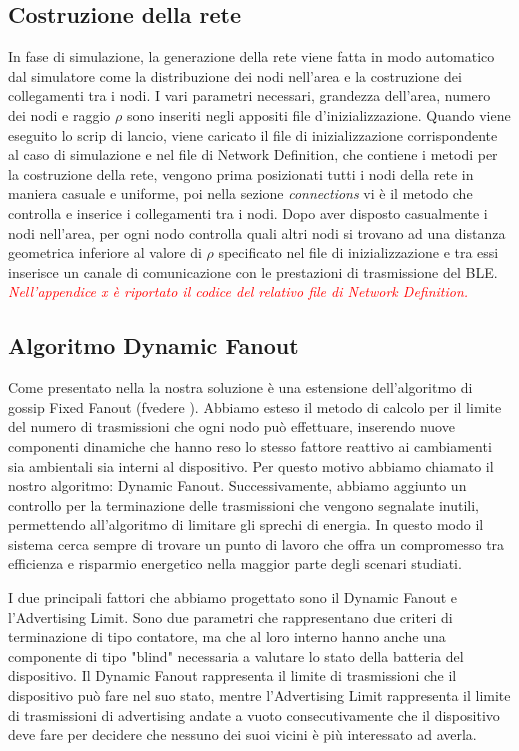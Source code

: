 \subsection{Costruzione della rete}
In fase di simulazione, la generazione della rete viene fatta in modo automatico dal simulatore come la distribuzione dei nodi nell'area e la costruzione dei collegamenti tra i nodi. I vari parametri necessari, grandezza dell'area, numero dei nodi e raggio $\rho$ sono inseriti negli appositi file d'inizializzazione. Quando viene eseguito lo scrip di lancio, viene caricato il file di inizializzazione corrispondente al caso di simulazione e nel file di Network Definition, che contiene i metodi per la costruzione della rete, vengono prima posizionati tutti i nodi della rete in maniera casuale e uniforme, poi nella sezione \textit{connections} vi è il metodo che controlla e inserice i collegamenti tra i nodi. Dopo aver disposto casualmente i nodi nell'area, per ogni nodo controlla quali altri nodi si trovano ad una distanza geometrica inferiore al valore di $\rho$ specificato nel file di inizializzazione e tra essi inserisce un canale di comunicazione con le prestazioni di trasmissione del BLE. \textit{\textcolor{red}{Nell'appendice x è riportato il codice del relativo file di Network Definition.}}

\subsection{Algoritmo Dynamic Fanout}
Come presentato nella  la nostra soluzione è una estensione dell'algoritmo di gossip Fixed Fanout (fvedere ). Abbiamo esteso il metodo di calcolo per il limite del numero di trasmissioni che ogni nodo può effettuare, inserendo nuove componenti dinamiche che hanno reso lo stesso fattore reattivo ai cambiamenti sia ambientali sia interni al dispositivo. Per questo motivo abbiamo chiamato il nostro algoritmo: Dynamic Fanout. Successivamente, abbiamo aggiunto un controllo per la terminazione delle trasmissioni che vengono segnalate inutili, permettendo all'algoritmo di limitare gli sprechi di energia. In questo modo il sistema cerca sempre di trovare un punto di lavoro che offra un compromesso tra efficienza e risparmio energetico nella maggior parte degli scenari studiati.

I due principali fattori che abbiamo progettato sono il Dynamic Fanout e l'Advertising Limit. Sono due parametri che rappresentano due criteri di terminazione di tipo contatore, ma che al loro interno hanno anche una componente di tipo "blind" necessaria a valutare lo stato della batteria del dispositivo. Il Dynamic Fanout rappresenta il limite di trasmissioni che il dispositivo può fare nel suo stato, mentre l'Advertising Limit rappresenta il limite di trasmissioni di advertising andate a vuoto consecutivamente che il dispositivo deve fare per decidere che nessuno dei suoi vicini è più interessato ad averla.

